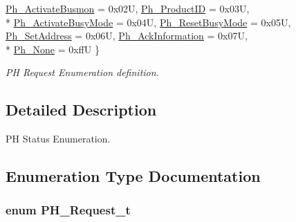\begin{DoxyCompactItemize}
\hyperlink{group___k_n_x___p_h___sup___exported___types_gga78f5bed722457f025cbc6786d5730d3eaaab6813d086f4fee2279e47bd9f474f1}{Ph\+\_\+\+Activate\+Busmon} = 0x02U, 
\hyperlink{group___k_n_x___p_h___sup___exported___types_gga78f5bed722457f025cbc6786d5730d3eab570f51bc280e629f45421a3d1f8240f}{Ph\+\_\+\+Product\+ID} = 0x03U, 
\\*
\hyperlink{group___k_n_x___p_h___sup___exported___types_gga78f5bed722457f025cbc6786d5730d3eabeba2b32d6d52cd78e0fcc0a2893fe55}{Ph\+\_\+\+Activate\+Busy\+Mode} = 0x04U, 
\hyperlink{group___k_n_x___p_h___sup___exported___types_gga78f5bed722457f025cbc6786d5730d3ea1d8679556ec07170396cbe6b50b2b1d3}{Ph\+\_\+\+Reset\+Busy\+Mode} = 0x05U, 
\hyperlink{group___k_n_x___p_h___sup___exported___types_gga78f5bed722457f025cbc6786d5730d3eab5991f81f2614188770e51ca5623de44}{Ph\+\_\+\+Set\+Address} = 0x06U, 
\hyperlink{group___k_n_x___p_h___sup___exported___types_gga78f5bed722457f025cbc6786d5730d3ea1e5d3927d90dd27ee5bfa4c20e6a3e46}{Ph\+\_\+\+Ack\+Information} = 0x07U, 
\\*
\hyperlink{group___k_n_x___p_h___sup___exported___types_gga78f5bed722457f025cbc6786d5730d3ea1d51205765884a81bd849f93602fa811}{Ph\+\_\+\+None} = 0xffU
 \}\begin{DoxyCompactList}\small\item\em PH Request Enumeration definition. \end{DoxyCompactList}
\end{DoxyCompactItemize}


\subsection{Detailed Description}
PH Status Enumeration. 



\subsection{Enumeration Type Documentation}
\subsubsection[{\texorpdfstring{P\+H\+\_\+\+Request\+\_\+t}{PH_Request_t}}]{\setlength{\rightskip}{0pt plus 5cm}enum {\bf P\+H\+\_\+\+Request\+\_\+t}}\hypertarget{group___k_n_x___p_h___sup___exported___types_ga78f5bed722457f025cbc6786d5730d3e}{}\label{group___k_n_x___p_h___sup___exported___types_ga78f5bed722457f025cbc6786d5730d3e}


